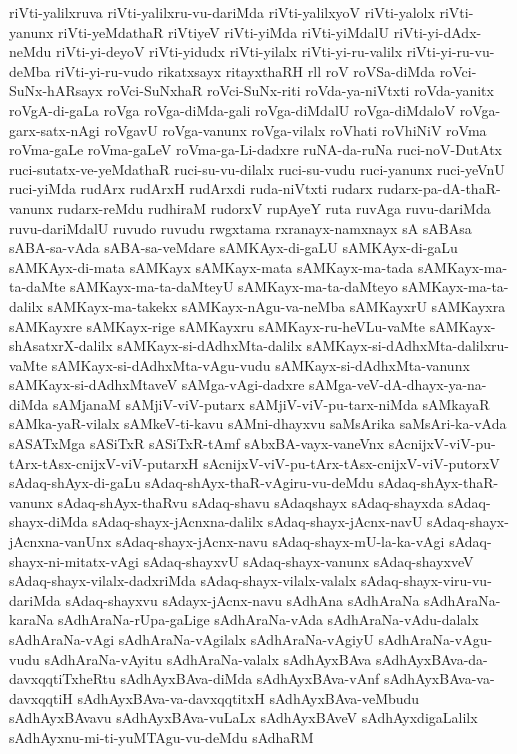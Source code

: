 {riVti-yalilxruva
riVti-yalilxru-vu-dariMda
riVti-yalilxyoV
riVti-yalolx
riVti-yanunx
riVti-yeMdathaR
riVtiyeV
riVti-yiMda
riVti-yiMdalU
riVti-yi-dAdx-neMdu
riVti-yi-deyoV
riVti-yidudx
riVti-yilalx
riVti-yi-ru-valilx
riVti-yi-ru-vu-deMba
riVti-yi-ru-vudo
rikatxsayx
ritayxthaRH
rll
roV
roVSa-diMda
roVci-SuNx-hARsayx
roVci-SuNxhaR
roVci-SuNx-riti
roVda-ya-niVtxti
roVda-yanitx
roVgA-di-gaLa
roVga
roVga-diMda-gali
roVga-diMdalU
roVga-diMdaloV
roVga-garx-satx-nAgi
roVgavU
roVga-vanunx
roVga-vilalx
roVhati
roVhiNiV
roVma
roVma-gaLe
roVma-gaLeV
roVma-ga-Li-dadxre
ruNA-da-ruNa
ruci-noV-DutAtx
ruci-sutatx-ve-yeMdathaR
ruci-su-vu-dilalx
ruci-su-vudu
ruci-yanunx
ruci-yeVnU
ruci-yiMda
rudArx
rudArxH
rudArxdi
ruda-niVtxti
rudarx
rudarx-pa-dA-thaR-vanunx
rudarx-reMdu
rudhiraM
rudorxV
rupAyeY
ruta
ruvAga
ruvu-dariMda
ruvu-dariMdalU
ruvudo
ruvudu
rwgxtama
rxranayx-namxnayx
sA
sABAsa
sABA-sa-vAda
sABA-sa-veMdare
sAMKAyx-di-gaLU
sAMKAyx-di-gaLu
sAMKAyx-di-mata
sAMKayx
sAMKayx-mata
sAMKayx-ma-tada
sAMKayx-ma-ta-daMte
sAMKayx-ma-ta-daMteyU
sAMKayx-ma-ta-daMteyo
sAMKayx-ma-ta-dalilx
sAMKayx-ma-takekx
sAMKayx-nAgu-va-neMba
sAMKayxrU
sAMKayxra
sAMKayxre
sAMKayx-rige
sAMKayxru
sAMKayx-ru-heVLu-vaMte
sAMKayx-shAsatxrX-dalilx
sAMKayx-si-dAdhxMta-dalilx
sAMKayx-si-dAdhxMta-dalilxru-vaMte
sAMKayx-si-dAdhxMta-vAgu-vudu
sAMKayx-si-dAdhxMta-vanunx
sAMKayx-si-dAdhxMtaveV
sAMga-vAgi-dadxre
sAMga-veV-dA-dhayx-ya-na-diMda
sAMjanaM
sAMjiV-viV-putarx
sAMjiV-viV-pu-tarx-niMda
sAMkayaR
sAMka-yaR-vilalx
sAMkeV-ti-kavu
sAMni-dhayxvu
saMsArika
saMsAri-ka-vAda
sASATxMga
sASiTxR
sASiTxR-tAmf
sAbxBA-vayx-vaneVnx
sAcnijxV-viV-pu-tArx-tAsx-cnijxV-viV-putarxH
sAcnijxV-viV-pu-tArx-tAsx-cnijxV-viV-putorxV
sAdaq-shAyx-di-gaLu
sAdaq-shAyx-thaR-vAgiru-vu-deMdu
sAdaq-shAyx-thaR-vanunx
sAdaq-shAyx-thaRvu
sAdaq-shavu
sAdaqshayx
sAdaq-shayxda
sAdaq-shayx-diMda
sAdaq-shayx-jAcnxna-dalilx
sAdaq-shayx-jAcnx-navU
sAdaq-shayx-jAcnxna-vanUnx
sAdaq-shayx-jAcnx-navu
sAdaq-shayx-mU-la-ka-vAgi
sAdaq-shayx-ni-mitatx-vAgi
sAdaq-shayxvU
sAdaq-shayx-vanunx
sAdaq-shayxveV
sAdaq-shayx-vilalx-dadxriMda
sAdaq-shayx-vilalx-valalx
sAdaq-shayx-viru-vu-dariMda
sAdaq-shayxvu
sAdayx-jAcnx-navu
sAdhAna
sAdhAraNa
sAdhAraNa-karaNa
sAdhAraNa-rUpa-gaLige
sAdhAraNa-vAda
sAdhAraNa-vAdu-dalalx
sAdhAraNa-vAgi
sAdhAraNa-vAgilalx
sAdhAraNa-vAgiyU
sAdhAraNa-vAgu-vudu
sAdhAraNa-vAyitu
sAdhAraNa-valalx
sAdhAyxBAva
sAdhAyxBAva-da-davxqqtiTxheRtu
sAdhAyxBAva-diMda
sAdhAyxBAva-vAnf
sAdhAyxBAva-va-davxqqtiH
sAdhAyxBAva-va-davxqqtitxH
sAdhAyxBAva-veMbudu
sAdhAyxBAvavu
sAdhAyxBAva-vuLaLx
sAdhAyxBAveV
sAdhAyxdigaLalilx
sAdhAyxnu-mi-ti-yuMTAgu-vu-deMdu
sAdhaRM
}
